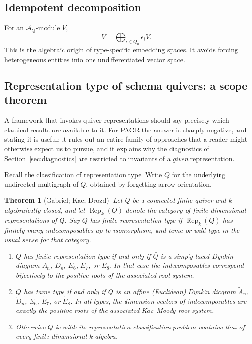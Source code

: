 \documentclass[11pt]{article}
\newtheorem{theorem}[definition]{Theorem}
\newcommand{\Rep}{\operatorname{Rep}}
\newcommand{\A}{\mathcal{A}}
\begin{document}
\subsection{Idempotent decomposition}
For an $\A_Q$-module $V$,
\[
V=\bigoplus_{i\in Q_0}e_iV.
\]
This is the algebraic origin of type-specific embedding spaces. It avoids forcing heterogeneous entities into one undifferentiated vector space.

\subsection{Representation type of schema quivers: a scope theorem}
\label{sec:reptype}

A framework that invokes quiver representations should say precisely which classical results are available to it. For PAGR the answer is sharply negative, and stating it is useful: it rules out an entire family of approaches that a reader might otherwise expect us to pursue, and it explains why the diagnostics of Section~\ref{sec:diagnostics} are restricted to invariants of a \emph{given} representation.

Recall the classification of representation type. Write $\bar Q$ for the underlying undirected multigraph of $Q$, obtained by forgetting arrow orientation.

\begin{theorem}[Gabriel; Kac; Drozd]
\label{thm:reptype}
Let $Q$ be a connected finite quiver and $k$ algebraically closed, and let $\Rep_k(Q)$ denote the category of finite-dimensional representations of $Q$. Say $Q$ has \emph{finite representation type} if $\Rep_k(Q)$ has finitely many indecomposables up to isomorphism, and \emph{tame} or \emph{wild} type in the usual sense for that category.
\begin{enumerate}[leftmargin=*,label=(\roman*)]
    \item \citep{gabriel1972} $Q$ has finite representation type if and only if $\bar Q$ is a simply-laced Dynkin diagram $A_n$, $D_n$, $E_6$, $E_7$, or $E_8$. In that case the indecomposables correspond bijectively to the positive roots of the associated root system.
    \item \citep{kac1980} $Q$ has tame type if and only if $\bar Q$ is an affine (Euclidean) Dynkin diagram $\tilde A_n$, $\tilde D_n$, $\tilde E_6$, $\tilde E_7$, or $\tilde E_8$. In all types, the dimension vectors of indecomposables are exactly the positive roots of the associated Kac--Moody root system.
    \item \citep{drozd1980} Otherwise $Q$ is wild: its representation classification problem contains that of every finite-dimensional $k$-algebra.
\end{enumerate}
\end{theorem}
\end{document}
